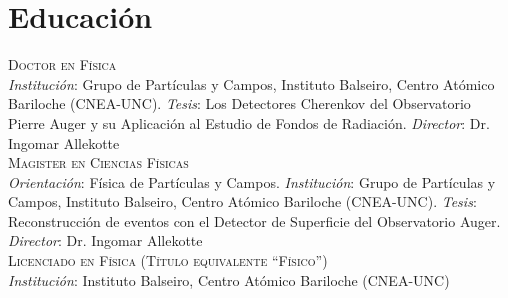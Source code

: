 \section*{Educación}
\noindent
{}\textsc{Doctor en Física}\\
{\emph{Institución}}: Grupo de Partículas y Campos, Instituto Balseiro, Centro Atómico Bariloche (CNEA-UNC). {\emph{Tesis}}: Los Detectores Cherenkov del Observatorio Pierre Auger y su Aplicación al Estudio de Fondos de Radiación. {\emph{Director}}: Dr. Ingomar Allekotte\\
\textsc{Magister en Ciencias Físicas}\\
{\emph{Orientación}}: Física de Partículas y Campos. {\emph{Institución}}: Grupo de Partículas y Campos, Instituto Balseiro, Centro Atómico Bariloche (CNEA-UNC). {\emph{Tesis}}: Reconstrucción de eventos con el Detector de Superficie del Observatorio Auger. {\emph{Director}}: Dr. Ingomar Allekotte\\
\textsc{Licenciado en Física (Título equivalente ``Físico'')}\\
{\emph{Institución}}: Instituto Balseiro, Centro Atómico Bariloche (CNEA-UNC)\\
\fi
